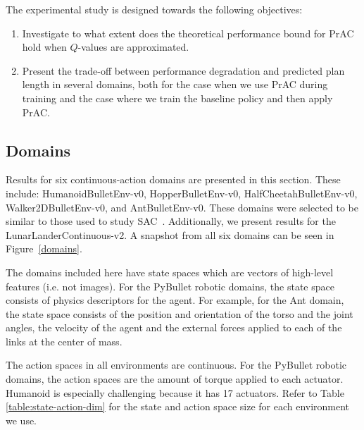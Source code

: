 \documentclass[letterpaper]{article} %
\begin{document}
The experimental study is designed towards the following objectives:
\begin{enumerate}
    \item Investigate to what extent does the theoretical performance bound for PrAC hold when $Q$-values are approximated.
    
    \item Present the trade-off between performance degradation and predicted plan length in several domains, both for the case when we use PrAC during training and the case where we train the baseline policy and then apply PrAC. 
\end{enumerate}



\subsection{Domains}
Results for six continuous-action domains are presented in this section. These include: HumanoidBulletEnv-v0, HopperBulletEnv-v0, HalfCheetahBulletEnv-v0, Walker2DBulletEnv-v0, and AntBulletEnv-v0. 
These domains were selected to be similar to those used to study SAC~\cite{haarnoja2018soft}. 
Additionally, we present results for the LunarLanderContinuous-v2. %
A snapshot from all six domains can be seen in Figure~\ref{domains}.



The domains included here have state spaces which are vectors of high-level features (i.e. not images). For the PyBullet robotic domains, the state space consists of physics descriptors for the agent. For example, for the Ant domain, the state space consists of the position and orientation of the torso and the joint angles, the velocity of the agent and the external forces applied to each of the links at the center of mass.

The action spaces in all environments are continuous. For the PyBullet robotic domains, the action spaces are the amount of torque applied to each actuator. Humanoid is especially challenging because it has 17 actuators. Refer to Table \ref{table:state-action-dim} for the state and action space size for each environment we use.
\end{document}

